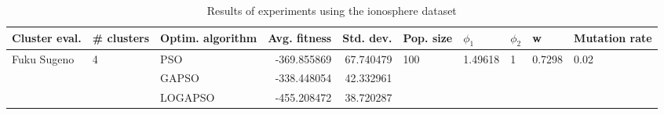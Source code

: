 \begin{table}
\centering
\caption{Results of experiments using the ionosphere dataset}
\begin{tabular}{lllrrlllll}
\toprule
               Cluster eval. &        \# clusters & Optim. algorithm &  Avg. fitness &  Std. dev. &            Pop. size &               $\phi_{1}$ &         $\phi_{2}$ &                       w &         Mutation rate \\
\midrule
\multirow{3}{*}{Fuku Sugeno} & \multirow{3}{*}{4} &              PSO &   -369.855869 &  67.740479 & \multirow{3}{*}{100} & \multirow{3}{*}{1.49618} & \multirow{3}{*}{1} & \multirow{3}{*}{0.7298} & \multirow{3}{*}{0.02} \\
                             &                    &            GAPSO &   -338.448054 &  42.332961 &                      &                          &                    &                         &                       \\
                             &                    &          LOGAPSO &   -455.208472 &  38.720287 &                      &                          &                    &                         &                       \\
\bottomrule
\end{tabular}
\end{table}
